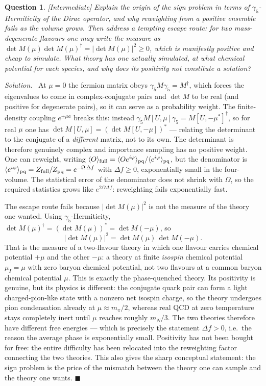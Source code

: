 \documentclass[11pt]{article}
\newcommand{\diff}[1]{\textcolor{blue!60!black}{\footnotesize\textsf{[#1]}}\quad}
\newtheorem{question}{Question}
\newenvironment{solution}{\par\smallskip\noindent\textit{Solution.}\ }{\hfill$\blacksquare$\par\smallskip}
\begin{document}
\begin{question}
\diff{Intermediate} Explain the origin of the sign problem in terms of $\gamma_5$-Hermiticity of the Dirac operator, and why reweighting from a positive ensemble fails as the volume grows. Then address a tempting escape route: for two mass-degenerate flavours one may write the measure as $\det M(\mu)\det M(\mu)^\dagger = |\det M(\mu)|^2 \geq 0$, which is manifestly positive and cheap to simulate. What theory has one actually simulated, at what chemical potential for each species, and why does its positivity not constitute a solution?
\end{question}
\begin{solution}
At $\mu = 0$ the fermion matrix obeys $\gamma_5 M \gamma_5 = M^\dagger$, which forces the eigenvalues to come in complex-conjugate pairs and $\det M$ to be real (and positive for degenerate pairs), so it can serve as a probability weight. The finite-density coupling $e^{\pm\mu a}$ breaks this: instead $\gamma_5 M[U,\mu]\gamma_5 = M[U,-\mu^*]^\dagger$, so for real $\mu$ one has $\det M[U,\mu] = (\det M[U,-\mu])^*$ --- relating the determinant to the conjugate of a \emph{different} matrix, not to its own. The determinant is therefore genuinely complex and importance sampling has no positive weight. One can reweight, writing $\langle O\rangle_{\rm full} = \langle O e^{i\varphi}\rangle_{\rm pq}/\langle e^{i\varphi}\rangle_{\rm pq}$, but the denominator is $\langle e^{i\varphi}\rangle_{\rm pq} = Z_{\rm full}/Z_{\rm pq} = e^{-\Omega\,\Delta f}$ with $\Delta f\geq0$, exponentially small in the four-volume. The statistical error of the denominator does not shrink with $\Omega$, so the required statistics grows like $e^{2\Omega\Delta f}$: reweighting fails exponentially fast.

The escape route fails because $|\det M(\mu)|^2$ is not the measure of the theory one wanted. Using $\gamma_5$-Hermiticity, $\det M(\mu)^\dagger = (\det M(\mu))^* = \det M(-\mu)$, so
\begin{equation}
|\det M(\mu)|^2 = \det M(\mu)\,\det M(-\mu).
\end{equation}
That is the measure of a two-flavour theory in which one flavour carries chemical potential $+\mu$ and the other $-\mu$: a theory at finite \emph{isospin} chemical potential $\mu_I = \mu$ with zero baryon chemical potential, not two flavours at a common baryon chemical potential $\mu$. This is exactly the phase-quenched theory. Its positivity is genuine, but its physics is different: the conjugate quark pair can form a light charged-pion-like state with a nonzero net isospin charge, so the theory undergoes pion condensation already at $\mu \approx m_\pi/2$, whereas real QCD at zero temperature stays completely inert until $\mu$ reaches roughly $m_N/3$. The two theories therefore have different free energies --- which is precisely the statement $\Delta f > 0$, i.e.\ the reason the average phase is exponentially small. Positivity has not been bought for free: the entire difficulty has been relocated into the reweighting factor connecting the two theories. This also gives the sharp conceptual statement: the sign problem is the price of the mismatch between the theory one can sample and the theory one wants.
\end{solution}
\end{document}
